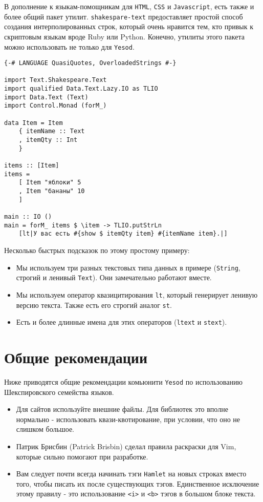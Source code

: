 В дополнение к языкам-помощникам для \texttt{HTML}, \texttt{CSS} и \texttt{Javascript}, есть также и более
общий пакет утилит. \lstinline!shakespare-text! предоставляет простой способ 
создания интерполированных строк, который очень нравится тем, кто привык к 
скриптовым языкам вроде Ruby или Python. Конечно, утилиты этого пакета можно
использовать не только для \texttt{Yesod}.

\begin{lstlisting}
{-# LANGUAGE QuasiQuotes, OverloadedStrings #-}

import Text.Shakespeare.Text
import qualified Data.Text.Lazy.IO as TLIO
import Data.Text (Text)
import Control.Monad (forM_)

data Item = Item
    { itemName :: Text
    , itemQty :: Int
    }

items :: [Item]
items =
    [ Item "яблоки" 5
    , Item "бананы" 10
    ]

main :: IO ()
main = forM_ items $ \item -> TLIO.putStrLn
    [lt|У вас есть #{show $ itemQty item} #{itemName item}.|]
\end{lstlisting}

Несколько быстрых подсказок по этому простому примеру:
\begin{itemize}
\item Мы используем три разных текстовых типа данных в примере 
(\lstinline!String!, строгий и ленивый \lstinline!Text!). Они замечательно
работают вместе.
\item Мы используем оператор квазицитирования \lstinline!lt!, который генерирует
ленивую версию текста. Также есть его строгий аналог \lstinline!st!.
\item Есть и более длинные имена для этих операторов 
(\lstinline!ltext! и \lstinline!stext!).
\end{itemize}

\section{Общие рекомендации}

Ниже приводятся общие рекомендации комьюнити \texttt{Yesod} по использованию
Шекспировского семейства языков.

\begin{itemize}
\item Для сайтов используйте внешние файлы. Для библиотек это вполне 
нормально - использовать квази-квотирование, при условии, что оно не слишком большое.
\item Патрик Брисбин (Patrick Brisbin) сделал правила раскраски для Vim, 
которые сильно помогают при разработке.
\item Вам следует почти всегда начинать тэги \texttt{Hamlet} на новых строках вместо того,
чтобы писать их после существующих тэгов. Единственное исключение этому правилу - это
использование \lstinline!<i>! и \lstinline!<b>! тэгов в большом блоке текста.
\end{itemize}
